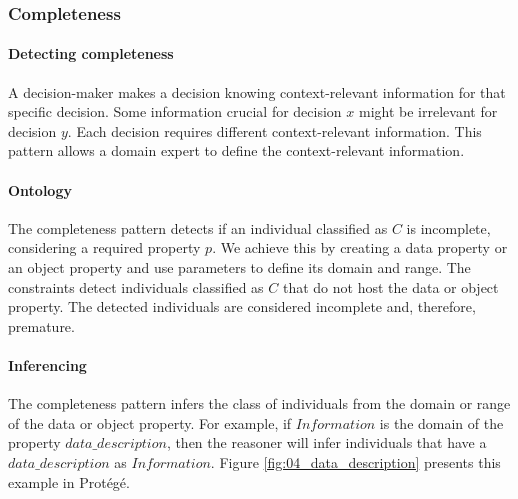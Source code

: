\subsubsection{Completeness} \label{odp_completeness}
\paragraph{Detecting completeness}
A decision-maker makes a decision knowing context-relevant information for that specific decision. Some information crucial for decision $x$ might be irrelevant for decision $y$. Each decision requires different context-relevant information. This pattern allows a domain expert to define the context-relevant information.

\begin{center}
\large\color{document}{The completeness pattern validates the completeness of information by detecting missing information.}
\end{center}

\paragraph{Ontology}
The completeness pattern detects if an individual classified as $C$ is incomplete, considering a required property $p$. We achieve this by creating a data property or an object property and use parameters to define its domain and range. The constraints detect individuals classified as $C$ that do not host the data or object property. The detected individuals are considered incomplete and, therefore, premature.

\paragraph{Inferencing}
The completeness pattern infers the class of individuals from the domain or range of the data or object property. For example, if $Information$ is the domain of the property $data\_description$, then the reasoner will infer individuals that have a $data\_description$ as $Information$. Figure \ref{fig:04_data_description} presents this example in Prot\'eg\'e.

